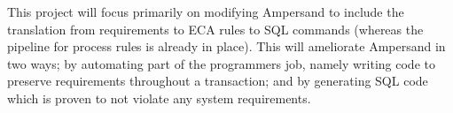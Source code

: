 \documentclass[12pt]{article}
\begin{document}
This project will focus primarily on modifying Ampersand to include the
translation from requirements to ECA rules to SQL commands (whereas the pipeline
for process rules is already in place). This will ameliorate Ampersand in two
ways; by automating part of the programmers job, namely writing code to preserve
requirements throughout a transaction; and by generating SQL code which is
proven to not violate any system requirements. 
\end{document}
